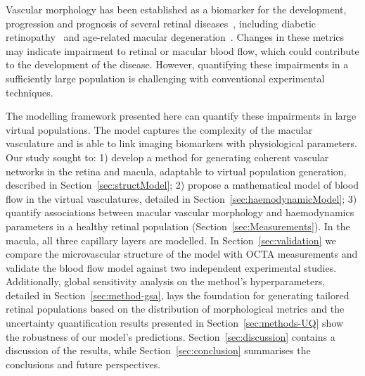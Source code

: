 \documentclass[11pt,]{article}
\begin{document}
Vascular morphology has been established as a biomarker for the development, progression and prognosis of several retinal diseases~\cite{Balaratnasingam_2023,Yao_2020}, including diabetic retinopathy~\cite{Garg2022,Hein_2023} and age-related macular degeneration~\cite{Told2023,Narnaware_2023}.
Changes in these metrics may indicate impairment to retinal or macular blood flow, which could contribute to the development of the disease.
However, quantifying these impairments in a sufficiently large population is challenging with conventional experimental techniques.

The modelling framework presented here can quantify these impairments in large virtual populations.
The model captures the complexity of the macular vasculature and is able to link imaging biomarkers with physiological parameters.
Our study sought to: 1) develop a method for generating coherent vascular networks in the retina and macula, adaptable to virtual population generation, described in Section~\ref{sec:structModel};
2) propose a mathematical model of blood flow in the virtual vasculatures, detailed in Section~\ref{sec:haemodynamicModel};
3) quantify associations between macular vascular morphology and haemodynamics parameters in a healthy retinal population (Section~\ref{sec:Measurements}).
In the macula, all three capillary layers are modelled.
In Section~\ref{sec:validation} we compare the microvascular structure of the model with OCTA measurements and validate the blood flow model against two independent experimental studies.
Additionally, global sensitivity analysis on the method's hyperparameters, detailed in Section~\ref{sec:method-gsa}, lays the foundation for generating tailored retinal populations based on the distribution of morphological metrics and the uncertainty quantification results presented in Section~\ref{sec:methods-UQ} show the robustness of our model's predictions. 
Section~\ref{sec:discussion} contains a discussion of the results, while Section~\ref{sec:conclusion} summarises the conclusions and future perspectives.
\end{document}
